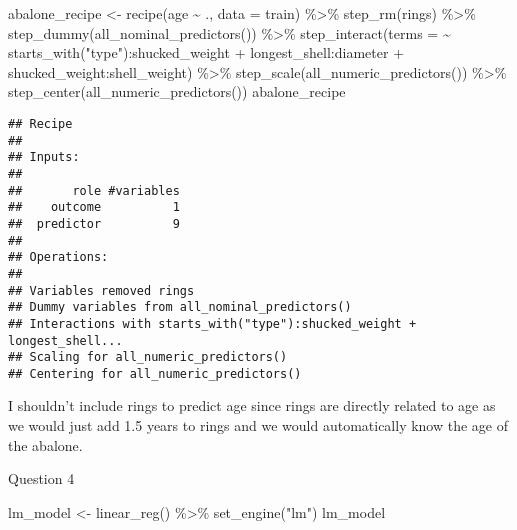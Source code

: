 \documentclass[
]{article}
\newenvironment{Shaded}{\begin{snugshade}}{\end{snugshade}}
\newcommand{\AttributeTok}[1]{\textcolor[rgb]{0.77,0.63,0.00}{#1}}
\newcommand{\FunctionTok}[1]{\textcolor[rgb]{0.00,0.00,0.00}{#1}}
\newcommand{\NormalTok}[1]{#1}
\newcommand{\OtherTok}[1]{\textcolor[rgb]{0.56,0.35,0.01}{#1}}
\newcommand{\SpecialCharTok}[1]{\textcolor[rgb]{0.00,0.00,0.00}{#1}}
\newcommand{\StringTok}[1]{\textcolor[rgb]{0.31,0.60,0.02}{#1}}
\begin{document}
\begin{Shaded}
\begin{Highlighting}[]
\NormalTok{abalone\_recipe }\OtherTok{\textless{}{-}} \FunctionTok{recipe}\NormalTok{(age }\SpecialCharTok{\textasciitilde{}}\NormalTok{ ., }\AttributeTok{data =}\NormalTok{ train) }\SpecialCharTok{\%\textgreater{}\%} 
  \FunctionTok{step\_rm}\NormalTok{(rings) }\SpecialCharTok{\%\textgreater{}\%}
  \FunctionTok{step\_dummy}\NormalTok{(}\FunctionTok{all\_nominal\_predictors}\NormalTok{()) }\SpecialCharTok{\%\textgreater{}\%}
  \FunctionTok{step\_interact}\NormalTok{(}\AttributeTok{terms =} \SpecialCharTok{\textasciitilde{}} \FunctionTok{starts\_with}\NormalTok{(}\StringTok{"type"}\NormalTok{)}\SpecialCharTok{:}\NormalTok{shucked\_weight }\SpecialCharTok{+}
\NormalTok{                  longest\_shell}\SpecialCharTok{:}\NormalTok{diameter }\SpecialCharTok{+}
\NormalTok{                  shucked\_weight}\SpecialCharTok{:}\NormalTok{shell\_weight) }\SpecialCharTok{\%\textgreater{}\%}
  \FunctionTok{step\_scale}\NormalTok{(}\FunctionTok{all\_numeric\_predictors}\NormalTok{()) }\SpecialCharTok{\%\textgreater{}\%}
  \FunctionTok{step\_center}\NormalTok{(}\FunctionTok{all\_numeric\_predictors}\NormalTok{())}
\NormalTok{abalone\_recipe}
\end{Highlighting}
\end{Shaded}

\begin{verbatim}
## Recipe
## 
## Inputs:
## 
##       role #variables
##    outcome          1
##  predictor          9
## 
## Operations:
## 
## Variables removed rings
## Dummy variables from all_nominal_predictors()
## Interactions with starts_with("type"):shucked_weight + longest_shell...
## Scaling for all_numeric_predictors()
## Centering for all_numeric_predictors()
\end{verbatim}

I shouldn't include rings to predict age since rings are directly
related to age as we would just add 1.5 years to rings and we would
automatically know the age of the abalone.

Question 4

\begin{Shaded}
\begin{Highlighting}[]
\NormalTok{lm\_model }\OtherTok{\textless{}{-}} \FunctionTok{linear\_reg}\NormalTok{() }\SpecialCharTok{\%\textgreater{}\%} 
  \FunctionTok{set\_engine}\NormalTok{(}\StringTok{"lm"}\NormalTok{)}
\NormalTok{lm\_model}
\end{Highlighting}
\end{Shaded}
\end{document}
